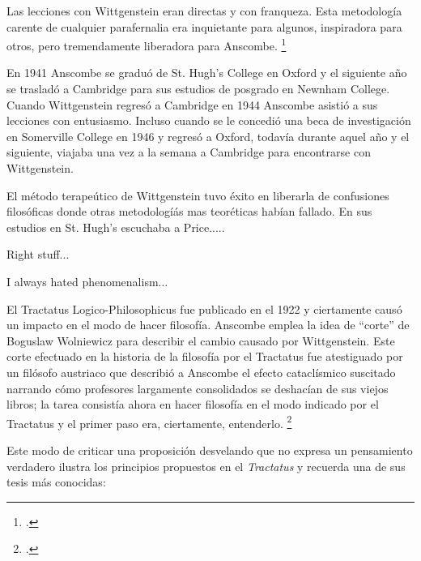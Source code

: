 Las lecciones con Wittgenstein eran directas y con franqueza. Esta metodología
carente de cualquier parafernalia era inquietante para algunos, inspiradora para
otros, pero tremendamente liberadora para Anscombe. \footcite[loc 9853 Chapter
4, Section 24, para. 5]{monk}

En 1941 Anscombe se graduó de St. Hugh's College en Oxford y el siguiente año se
trasladó a Cambridge para sus estudios de posgrado en Newnham College. Cuando
Wittgenstein regresó a Cambridge en 1944 Anscombe asistió a sus lecciones con
entusiasmo. Incluso cuando se le concedió una beca de investigación en
Somerville College en 1946 y regresó a Oxford, todavía durante aquel año y el
siguiente, viajaba una vez a la semana a Cambridge para encontrarse con
Wittgenstein.  

El método terapeútico de Wittgenstein tuvo éxito en liberarla de confusiones
filosóficas donde otras metodologíás mas teoréticas habían fallado. En sus
estudios en St. Hugh's escuchaba a Price.....

Right stuff...

I always hated phenomenalism...

El Tractatus Logico-Philosophicus fue publicado en el 1922 y ciertamente causó
un impacto en el modo de hacer filosofía. Anscombe emplea la idea de ``corte''
de Boguslaw Wolniewicz para describir el cambio causado por Wittgenstein. Este
corte efectuado en la historia de la filosofía por el Tractatus fue atestiguado
por un filósofo austriaco que describió a Anscombe el efecto cataclísmico
suscitado narrando cómo profesores largamente consolidados se deshacían de sus
viejos libros; la tarea consistía ahora en hacer filosofía en el modo indicado
por el Tractatus y el primer paso era, ciertamente, entenderlo.
\footcite[p.181]{twocuts} 


Este modo de criticar una proposición desvelando que no expresa un pensamiento
verdadero ilustra los principios propuestos en el \emph{Tractatus} y recuerda
una de sus tesis más conocidas: 



